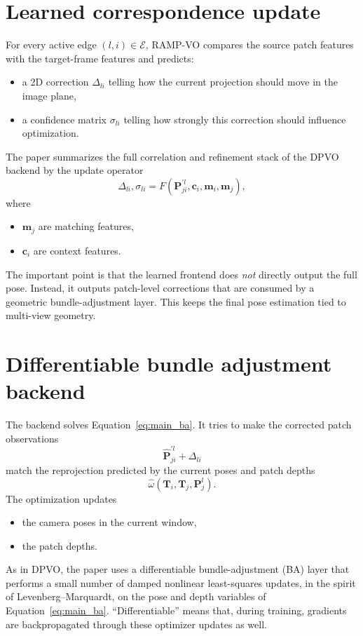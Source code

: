 \documentclass[11pt]{article}
\begin{document}
\section{Learned correspondence update}

For every active edge \((l,i)\in\mathcal{E}\), RAMP-VO compares the source patch features with the target-frame features and predicts:
\begin{itemize}
    \item a 2D correction \(\Delta_{li}\) telling how the current projection should move in the image plane,
    \item a confidence matrix \(\sigma_{li}\) telling how strongly this correction should influence optimization.
\end{itemize}
The paper summarizes the full correlation and refinement stack of the DPVO backend by the update operator
\begin{equation}
\Delta_{li},\sigma_{li} = F(\mathbf{P}_{ji}^{\prime l},\mathbf{c}_i,\mathbf{m}_i,\mathbf{m}_j),
\end{equation}
where
\begin{itemize}
    \item \(\mathbf{m}_j\) are matching features,
    \item \(\mathbf{c}_i\) are context features.
\end{itemize}
The important point is that the learned frontend does \emph{not} directly output the full pose.
Instead, it outputs patch-level corrections that are consumed by a geometric bundle-adjustment layer.
This keeps the final pose estimation tied to multi-view geometry.

\section{Differentiable bundle adjustment backend}

The backend solves Equation~\eqref{eq:main_ba}.
It tries to make the corrected patch observations
\begin{equation}
\hat{\mathbf{P}}_{ji}^{\prime l} + \Delta_{li}
\end{equation}
match the reprojection predicted by the current poses and patch depths
\begin{equation}
\hat{\omega}(\mathbf{T}_i,\mathbf{T}_j,\mathbf{P}_j^l).
\end{equation}
The optimization updates
\begin{itemize}
    \item the camera poses in the current window,
    \item the patch depths.
\end{itemize}
As in DPVO, the paper uses a differentiable bundle-adjustment (BA) layer that performs a small number of damped nonlinear least-squares updates, in the spirit of Levenberg--Marquardt, on the pose and depth variables of Equation~\eqref{eq:main_ba}. ``Differentiable'' means that, during training, gradients are backpropagated through these optimizer updates as well.
\end{document}
